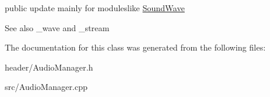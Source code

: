 public update mainly for moduleslike \hyperlink{classSoundWave}{Sound\+Wave} 

\begin{DoxySeeAlso}{See also}
\+\_\+wave and \+\_\+stream 
\end{DoxySeeAlso}


The documentation for this class was generated from the following files\+:\begin{DoxyCompactItemize}
\item 
header/Audio\+Manager.\+h\item 
src/Audio\+Manager.\+cpp\end{DoxyCompactItemize}
